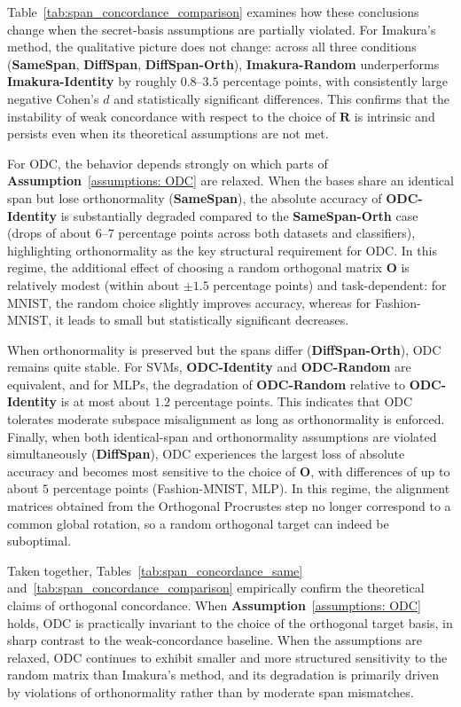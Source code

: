 \documentclass[final,3p,times]{elsarticle}
\theoremstyle{plain}
\newcommand{\matr}[1]{\bm{#1}}        %
\begin{document}
Table~\ref{tab:span_concordance_comparison} examines how these conclusions change when the secret-basis assumptions are partially violated. For Imakura's method, the qualitative picture does not change: across all three conditions (\textbf{SameSpan}, \textbf{DiffSpan}, \textbf{DiffSpan-Orth}), \textbf{Imakura-Random} underperforms \textbf{Imakura-Identity} by roughly $0.8$--$3.5$ percentage points, with consistently large negative Cohen's $d$ and statistically significant differences. This confirms that the instability of weak concordance with respect to the choice of $\matr{R}$ is intrinsic and persists even when its theoretical assumptions are not met.

For ODC, the behavior depends strongly on which parts of \textbf{Assumption}~\ref{assumptions: ODC} are relaxed. When the bases share an identical span but lose orthonormality (\textbf{SameSpan}), the absolute accuracy of \textbf{ODC-Identity} is substantially degraded compared to the \textbf{SameSpan-Orth} case (drops of about $6$--$7$ percentage points across both datasets and classifiers), highlighting orthonormality as the key structural requirement for ODC. In this regime, the additional effect of choosing a random orthogonal matrix $\matr{O}$ is relatively modest (within about $\pm 1.5$ percentage points) and task-dependent: for MNIST, the random choice slightly improves accuracy, whereas for Fashion-MNIST, it leads to small but statistically significant decreases.

When orthonormality is preserved but the spans differ (\textbf{DiffSpan-Orth}), ODC remains quite stable. For SVMs, \textbf{ODC-Identity} and \textbf{ODC-Random} are equivalent, and for MLPs, the degradation of \textbf{ODC-Random} relative to \textbf{ODC-Identity} is at most about $1.2$ percentage points. This indicates that ODC tolerates moderate subspace misalignment as long as orthonormality is enforced. Finally, when both identical-span and orthonormality assumptions are violated simultaneously (\textbf{DiffSpan}), ODC experiences the largest loss of absolute accuracy and becomes most sensitive to the choice of $\matr{O}$, with differences of up to about $5$ percentage points (Fashion-MNIST, MLP). In this regime, the alignment matrices obtained from the Orthogonal Procrustes step no longer correspond to a common global rotation, so a random orthogonal target can indeed be suboptimal.

Taken together, Tables~\ref{tab:span_concordance_same} and~\ref{tab:span_concordance_comparison} empirically confirm the theoretical claims of orthogonal concordance. When \textbf{Assumption}~\ref{assumptions: ODC} holds, ODC is practically invariant to the choice of the orthogonal target basis, in sharp contrast to the weak-concordance baseline. When the assumptions are relaxed, ODC continues to exhibit smaller and more structured sensitivity to the random matrix than Imakura's method, and its degradation is primarily driven by violations of orthonormality rather than by moderate span mismatches.
\end{document}
